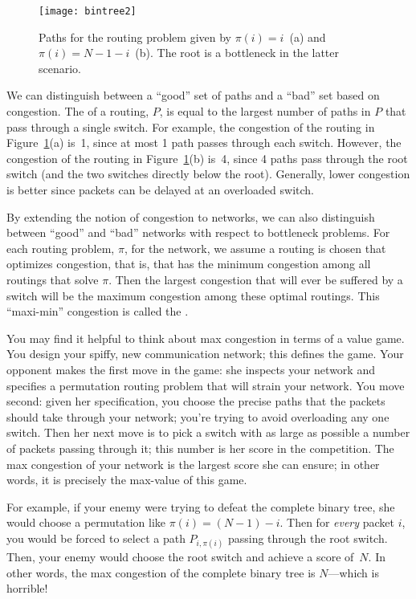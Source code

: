 \begin{figure}
\texttt{[image: bintree2]}


\caption{Paths for the routing problem given by $\pi(i) = i$~(a) and
  $\pi(i) = N - 1 - i$~(b).  The root is a bottleneck in the latter
  scenario.}

\label{fig:6EJ}

\end{figure}

We can distinguish between a ``good'' set of paths and a ``bad'' set
based on congestion.  The  of a routing, $P$, is
equal to the largest number of paths in $P$ that pass through a single
switch.  For example, the congestion of the routing in
Figure~\ref{fig:6EJ}(a) is~1, since at most 1 path passes through each
switch.  However, the congestion of the routing in
Figure~\ref{fig:6EJ}(b) is~4, since 4 paths pass through the root
switch (and the two switches directly below the root).  Generally,
lower congestion is better since packets can be delayed at an
overloaded switch.

By extending the notion of congestion to networks, we can also distinguish
between ``good'' and ``bad'' networks with respect to bottleneck problems.
For each routing problem, $\pi$, for the network, we assume a routing is
chosen that optimizes congestion, that is, that has the minimum congestion
among all routings that solve $\pi$.  Then the largest congestion that
will ever be suffered by a switch will be the maximum congestion among
these optimal routings.  This ``maxi-min'' congestion is called the
.

You may find it helpful to think about max congestion in terms of a
value game.  You design your spiffy, new communication network; this
defines the game.  Your opponent makes the first move in the game: she
inspects your network and specifies a permutation routing problem that
will strain your network.  You move second: given her specification,
you choose the precise paths that the packets should take through your
network; you're trying to avoid overloading any one switch.  Then her
next move is to pick a switch with as large as possible a number of
packets passing through it; this number is her score in the
competition.  The max congestion of your network is the largest score
she can ensure; in other words, it is precisely the max-value of this
game.

For example, if your enemy were trying to defeat the complete binary
tree, she would choose a permutation like $\pi(i) = (N - 1) - i$.
Then for \emph{every} packet $i$, you would be forced to select a path
$P_{i, \pi(i)}$ passing through the root switch.  Then, your enemy
would choose the root switch and achieve a score of~$N$.  In other
words, the max congestion of the complete binary tree is $N$---which
is horrible!

